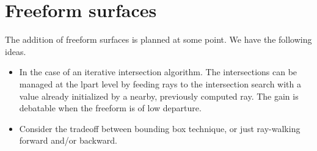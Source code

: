 \section{Freeform surfaces}
The addition of freeform surfaces is planned at some point.
We have the following ideas.

\begin{itemize}
\item In the case of an iterative intersection algorithm. The intersections can
      be managed at the lpart level by feeding rays to the intersection search
      with a value already initialized by a nearby, previously computed ray.
      The gain is debatable when the freeform is of low departure.
\item Consider the tradeoff between bounding box technique, or just ray-walking
forward and/or backward.
\end{itemize}
